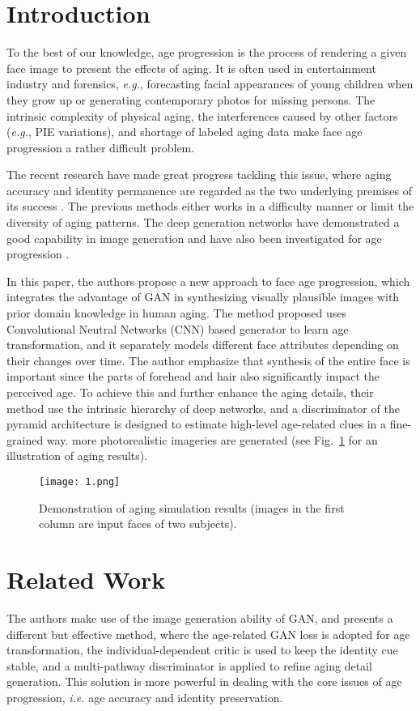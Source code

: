 \documentclass[10pt,twocolumn,letterpaper]{article}
\begin{document}
\section{Introduction}
To the best of our knowledge, age progression is the process of rendering a given face image to present the effects of aging. It is often used in entertainment 
industry and forensics, \textit{e.g.}, forecasting facial appearances of young children when they grow up 
or generating contemporary photos for missing persons.
The intrinsic complexity of physical aging, the interferences caused by other factors (\textit{e.g.}, PIE variations), and shortage of labeled aging data  make face age progression a rather difficult problem.
\par
The recent research have made great progress tackling this issue, where aging accuracy and identity permanence are regarded as the two underlying premises of its success \cite{suo2010compositional,shu2015personalized,yang2016face}. The previous methods either works in a difficulty manner or limit the diversity of aging 
patterns. The deep generation networks have demonstrated a good capability in image generation \cite{dosovitskiy2016generating,goodfellow2014generative,isola2017image} and have also been investigated for age progression \cite{wang2016recurrent,zhang2017age}.
\par
In this paper, the authors propose a new approach to face age progression, which integrates the advantage of
GAN in synthesizing visually plausible images with 
prior domain knowledge in human aging. The method proposed uses Convolutional Neutral Networks (CNN) based
generator to learn age transformation, and it separately models different face attributes depending on their changes over time. The author emphasize that synthesis of the entire face is important since the parts of forehead and hair also significantly impact the perceived age. To achieve this and further enhance the aging details, their method use the intrinsic hierarchy of deep networks, and a discriminator of the pyramid architecture is designed to estimate
high-level age-related clues in a fine-grained way.
more photorealistic imageries are generated (see Fig.~\ref{fig1} for an illustration of aging results).
\begin{figure}[t]
	\centering
	\texttt{[image: 1.png]}
	\caption{Demonstration of aging simulation results (images in the first column are input faces of two subjects).}
	\label{fig1}
\end{figure}
\section{Related Work}
The authors make use of the image generation ability of GAN, 
and presents a different but effective method,
where the age-related GAN loss is adopted for age transformation, 
the individual-dependent critic is used to keep the identity cue stable, 
and a multi-pathway discriminator is applied 
to refine aging detail generation. This solution is more
powerful in dealing with the core issues of age progression,
\textit{i.e.} age accuracy and identity preservation.
\end{document}

